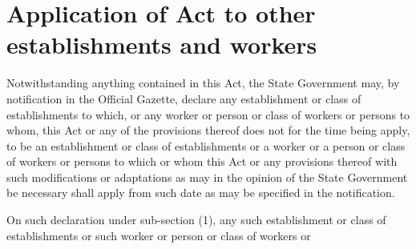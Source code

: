 \documentclass{mhact}
\begin{document}
\section{Application of Act to other establishments and workers }
\begin{subsectionlist}
\item Notwithstanding anything contained in this Act, the State
Government may, by notification in the Official Gazette, declare any
establishment or class of establishments to which, or any worker or person
or class of workers or persons to whom, this Act or any of the provisions
thereof does not for the time being apply, to be an establishment or class of
establishments or a worker or a person or class of workers or persons to
which or whom this Act or any provisions thereof with such modifications or
adaptations as may in the opinion of the State Government be necessary
shall apply from such date as may be specified in the notification.
\item On such declaration under sub-section (1), any such establishment
or class of establishments or such worker or person or class of workers or

\end{subsectionlist}





\makedocket
\end{document}
